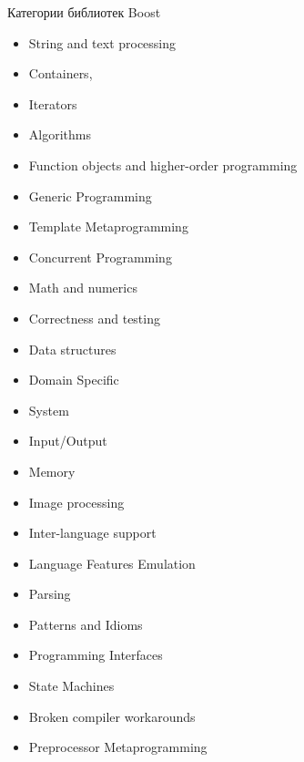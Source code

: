 \documentclass[aspectration=1610,t]{beamer}
\begin{document}
\begin{frame}[fragile]{Категории библиотек Boost}
\medskip

    \begin{minipage}{.45\textwidth}
\begin{itemize}
    \item String and text processing
    \item Containers, 
    \item Iterators
    \item Algorithms
    \item Function objects and higher-order programming
    \item Generic Programming
    \item Template Metaprogramming
    \item Concurrent Programming
    \item Math and numerics
    \item Correctness and testing
    \item Data structures
    \item Domain Specific
    \item System
    \end{itemize}
\end{minipage}%
\begin{minipage}{.4\textwidth}
\begin{itemize}
    \item Input/Output
    \item Memory
    \item Image processing
    \item Inter-language support
    \item Language Features Emulation
    \item Parsing
    \item Patterns and Idioms
    \item Programming Interfaces
    \item State Machines
    \item Broken compiler workarounds
    \item Preprocessor Metaprogramming
\end{itemize}
\end{minipage}%
\end{frame}
\end{document}
